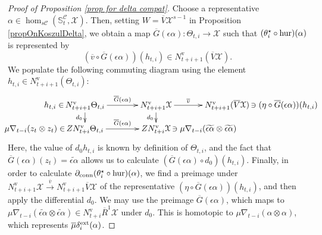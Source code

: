 \documentclass[11pt]{amsart} \renewcommand{\baselinestretch}{1.2}
\theoremstyle{plain}
\numberwithin{equation}{section} %
\theoremstyle{plain}
\numberwithin{equation}{chapter} %
\renewcommand{\to}{\longrightarrow}
\newcommand{\calx}{\mathcal{X}}
\newcommand{\calc}{\mathcal{C}}
\newcommand{\Nabla}{\nabla}
\newcommand{\uver}{^\mathrm{v}}
\newcommand{\Dendo}{R}
\begin{document}
\begin{Operations on the Bousfield-Kan spectral sequence}
\begin{proof}[Proof of Proposition \ref{prop for delta compat}]
Choose a representative $\alpha\in\hom_{s\calc}(\mathbb{S}^\calc_t, \calx )$. Then, setting $W=\overline{V}\calx^{s-1}$ in Proposition \ref{propOnKoszulDelta}, we obtain a map $\overline{G}(\epsilon\alpha):\Theta_{t,i}\to \calx $ such that $(\theta_i^\star\circ\textup{hur})(\alpha)$ is represented by
\[(\overline{v}\circ \overline{G}(\epsilon\alpha))(h_{t,i})
\in N\uver_{t+i+1}(\overline{V}\calx).\]
We populate the following commuting diagram using the element $h_{t,i}\in N\uver_{t+i+1}(\Theta_{t,i})$:
%
\[\xymatrix@R=10mm@C=30mm@!0{
\makebox[0cm][r]{$h_{t,i}\in\,$}N\uver_{t+i+1}\Theta_{t,i}\ar[d]_-{d_0}\ar[r]^-{\overline{G}(\epsilon\alpha)}&%
N\uver_{t+i+1}\calx \ar[d]_-{d_0}
\ar[r]^-{\overline{v}}
&%
N\uver_{t+i+1}(\overline{V}\calx)
\makebox[0cm][l]{$\,\ni (\eta\circ \overline{G}(\epsilon\alpha))(h_{t,i})$}
\\%
\makebox[0cm][r]{$\mu\Nabla_{t-i}( z_t\otimes  z_t)\in\,$}ZN\uver_{t+i}\Theta_{t,i}\ar[r]^-{\overline{G}(\epsilon\alpha)}
&%
ZN\uver_{t+i}\calx \makebox[0cm][l]{$\,\ni\mu\Nabla_{t-i}(\widetilde{\epsilon\alpha}\otimes \widetilde{\epsilon\alpha})$}
&%
}\]
Here, the value of $d_0h_{t,i}$ is known by definition of $\Theta_{t,i}$, 
and the fact that $\overline{G}(\epsilon\alpha)( z_t)=\widetilde{\epsilon\alpha}$ allows us to calculate $(\overline{G}(\epsilon\alpha)\circ d_0)(h_{t,i})$. Finally, in order to calculate $\partial_\textup{conn}(\theta_i^\star\circ\textup{hur})(\alpha)$, we find a preimage under $N\uver_{t+i+1}\calx \overset{\overline{v}}{\to}N\uver_{t+i+1}\overline{V}\calx$ of the representative $(\eta\circ \overline{G}(\epsilon\alpha))(h_{t,i})$, and then apply the differential $d_0$. We may use the preimage $\overline{G}(\epsilon\alpha)$, which maps to $\mu\Nabla_{t-i}(\widetilde{\epsilon\alpha}\otimes \widetilde{\epsilon\alpha})\in N\uver_{t+i}\overline{\Dendo}^1\calx $ under $d_0$. This is homotopic to $\mu\Nabla_{t-i}(\alpha\otimes \alpha)$, which represents $\overline{\mu}\delta^\textup{ext}_i(\alpha)$.
\end{proof}

\end{Operations on the Bousfield-Kan spectral sequence}
\end{document}
